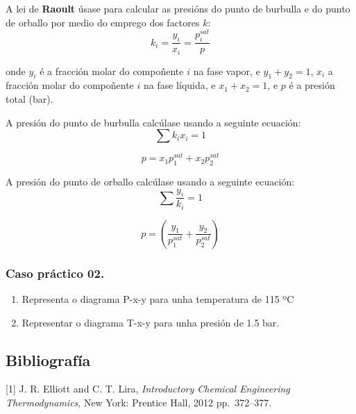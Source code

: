\documentclass[
  letterpaper,
  DIV=11,
  numbers=noendperiod]{scrartcl}
\providecommand{\tightlist}{%
  \setlength{\itemsep}{0pt}\setlength{\parskip}{0pt}}\usepackage{longtable,booktabs,array}
\begin{document}
A lei de \textbf{Raoult} úsase para calcular as presións do punto de
burbulla e do punto de orballo por medio do emprego dos factores \(k\):
\[
k_i = \frac {y_i} {x_i} = \frac {p_i^{sat}} {p}
\]

onde \(y_i\) é a fracción molar do compoñente \(i\) na fase vapor, e
\(y_1 + y_2 = 1\), \(x_i\) a fracción molar do compoñente \(i\) na fase
líquida, e \(x_1 + x_2 = 1\), e \(p\) é a presión total (bar).

A presión do punto de burbulla calcúlase usando a seguinte ecuación: \[
\sum k_ix_i =1
\]

\[
p = x_1 p_1^{sat} + x_2 p_2^{sat}
\]

A presión do punto de orballo calcúlase usando a seguinte ecuación: \[
\sum \frac {y_i} {k_i} = 1
\]

\[
p = \left ( \frac {y_1} {p_1^{sat}} + \frac {y_2} {p_2^{sat}} \right )
\]

\subsubsection{Caso práctico 02.}\label{caso-pruxe1ctico-02.}

\begin{enumerate}
\def\labelenumi{\arabic{enumi}.}
\tightlist
\item
  Representa o diagrama P-x-y para unha temperatura de 115 ºC
\item
  Representar o diagrama T-x-y para unha presión de 1.5 bar.
\end{enumerate}

\subsection{Bibliografía}\label{bibliografuxeda}

{[}1{]} J. R. Elliott and C. T. Lira, \emph{Introductory Chemical
Engineering Thermodynamics}, New York: Prentice Hall, 2012 pp.~372--377.
\end{document}

